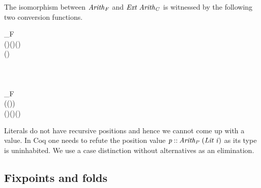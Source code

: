 The isomorphism between \ensuremath{\Varid{Arith}_F} and \ensuremath{\Conid{Ext}\;\Varid{Arith_{C}}} is witnessed
by the following two conversion functions.
\begin{hscode}\SaveRestoreHook
{}%
%
%
%
%
%
%
\>[3]{}\mathbin{::}_F\;\to {}\;\;\<[E]%
\\
\>[3]{}\;(\;){}\<[18]%
\>[18]{}\mathrel{=}\;(\;)\;(\lambda {}\to {}\;\;\;){}\<[E]%
\\
\>[3]{}\;(\;\;)\mathrel{=}\;\;\<[E]%
\\
\>[3]{}\<[5]%
\>[5]{}\;{}\<[12]%
\>[12]{}\mathbin{::}\;\to {}\<[E]%
\\
\>[12]{}\;\mathrel{=}\<[E]%
\\
\>[12]{}\;\mathrel{=}\<[E]%
\\
\>[3]{}\mathbin{::}\;\;\to {}_F\;\<[E]%
\\
\>[3]{}\;(\;(\;)\;{}\<[21]%
\>[21]{})\mathrel{=}\;\<[E]%
\\
\>[3]{}\;(\;\;{}\<[21]%
\>[21]{})\mathrel{=}\;(\;)\;(\;){}\<[E]%
\ColumnHook
\end{hscode}\resethooks
Literals do not have recursive positions and hence we cannot come up
with a value. In Coq one needs to refute the position value \ensuremath{\Varid{p}\mathbin{::}\Varid{Arith_{P}}\;(\Conid{Lit}\;\Varid{i})} as its type is uninhabited. We use a case distinction
without alternatives as an elimination.

\subsection{Fixpoints and folds}\label{ssec:contfixandfold}

